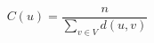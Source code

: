 \documentclass[12pt]{article}
\begin{document}
\[
C\left(u\right) =
    \frac{n}{\sum_{v \in V}{d\left(u,v\right)}}
\]
\end{document}
